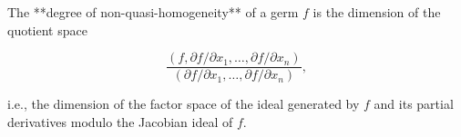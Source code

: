 The **degree of non-quasi-homogeneity** of a germ $f$ is the dimension of the quotient space

$$\frac{(f, \partial f / \partial x_1, \ldots, \partial f / \partial x_n)}{(\partial f / \partial x_1, \ldots, \partial f / \partial x_n)},$$

i.e., the dimension of the factor space of the ideal generated by $f$ and its partial derivatives modulo the Jacobian ideal of $f$.
